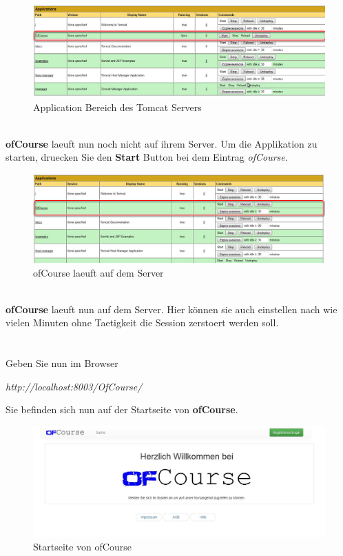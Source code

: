 \documentclass[a4paper, 12pt]{scrreprt}
\begin{document}
\begin{figure}[h]
\centering
\includegraphics[width=0.8\linewidth]{Grafiken/ApplicationBereichServerDeployed}
\caption{Application Bereich des Tomcat Servers}
\label{fig:ApplicationBereichServerDeployed}
\end{figure}
\ \\
\textbf{ofCourse} laeuft nun noch nicht auf ihrem Server. Um die Applikation zu starten, druecken Sie den \textbf{Start} Button bei dem Eintrag {\it ofCourse}.
\begin{figure}[h]
\centering
\includegraphics[width=0.8\linewidth]{Grafiken/ofCourseDeployed}
\caption{ofCourse laeuft auf dem Server}
\label{fig:OfCourseDeployed}
\end{figure}
\\ 
\textbf{ofCourse} laeuft nun auf dem Server. Hier können sie auch einstellen nach wie vielen Minuten ohne Taetigkeit die Session zerstoert werden soll.\ \\
\ \\
\newpage
\ \\
Geben Sie nun im Browser 
\begin{center}
	{\it http://localhost:8003/OfCourse/}
\end{center}
Sie befinden sich nun auf der Startseite von \textbf{ofCourse}.
\begin{figure}[h]
	\centering
	\includegraphics[width=0.8\linewidth]{Grafiken/indexPage}
	\caption[]{Startseite von ofCourse}
	\label{fig:indexPage1}
\end{figure} 
\end{document}
